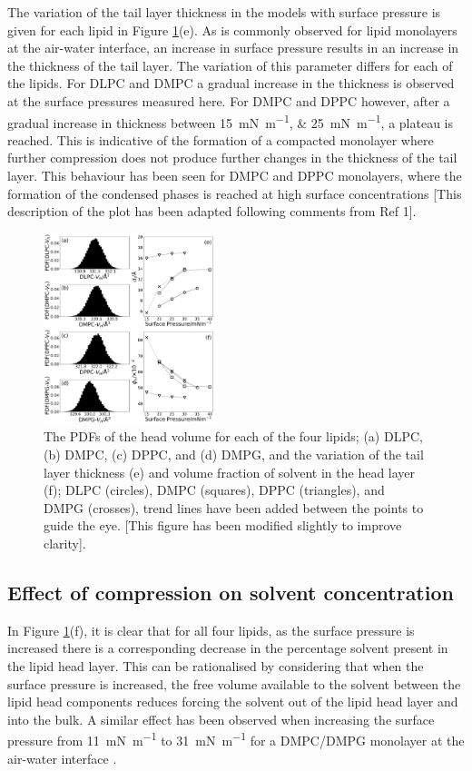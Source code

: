 \documentclass[amsmath,amssymb,twocolumn,superscriptaddress]{revtex4-1}
\begin{document}
The variation of the tail layer thickness in the models with surface pressure is given for each lipid in Figure \ref{fig:lipresults}(e).
As is commonly observed for lipid monolayers at the air-water interface, an increase in surface pressure results in an increase in the thickness of the tail layer.
The variation of this parameter differs for each of the lipids.
For DLPC and DMPC a gradual increase in the thickness is observed at the surface pressures measured here.
For DMPC and DPPC however, after a gradual increase in thickness between \SIlist{15;25}{\milli\newton\per\meter}, a plateau is reached.
This is indicative of the formation of a compacted monolayer where further compression does not produce further changes in the thickness of the tail layer.
This behaviour has been seen for DMPC and DPPC monolayers, where the formation of the condensed phases is reached at high surface concentrations \cite{mohwald_phospholipid_1990} [This description of the plot has been adapted following comments from Ref 1].
%
\begin{figure}
    \centering
    \includegraphics[width=0.45\textwidth]{figures/vh_dt_phih}
    \caption{\small The PDFs of the head volume for each of the four lipids; (a) DLPC, (b) DMPC, (c) DPPC, and (d) DMPG, and the variation of the tail layer thickness (e) and volume fraction of solvent in the head layer (f); DLPC (circles), DMPC (squares), DPPC (triangles), and DMPG (crosses), trend lines have been added between the points to guide the eye. [This figure has been modified slightly to improve clarity].}
    \label{fig:lipresults}
\end{figure}
%

\subsection{Effect of compression on solvent concentration}
%
In Figure \ref{fig:lipresults}(f), it is clear that for all four lipids, as the surface pressure is increased there is a corresponding decrease in the percentage solvent present in the lipid head layer.
This can be rationalised by considering that when the surface pressure is increased, the free volume available to the solvent between the lipid head components reduces forcing the solvent out of the lipid head layer and into the bulk.
A similar effect has been observed when increasing the surface pressure from \SI{11}{\milli\newton\per\meter} to \SI{31}{\milli\newton\per\meter} for a DMPC/DMPG monolayer at the air-water interface \cite{bayerl_specular_1990}.
\end{document}
